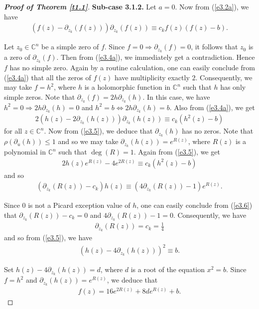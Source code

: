 \documentclass[11pt, reqno]{amsart}
\newtheorem*{cor A}{Corollary A}
\newtheorem*{cor B}{Corollary B}
\numberwithin{equation}{section}
\begin{document}
\begin{proof}[{\bf Proof of Theorem \ref{t1.1}}]
\smallskip
{\bf Sub-case 3.1.2.} Let $a=0$. Now from (\ref{e3.2a}), we have
\begin{align}\label{e3.4a} 
(f(z)-\partial_{z_k}(f(z)))\partial_{z_k}(f(z))\equiv c_k f(z)(f(z)-b).
\end{align}

Let $z_0\in\mathbb{C}^n$ be a simple zero of $f$. Since $f=0\Rightarrow \partial_{z_k}(f)=0$, it follows that $z_0$ is a zero of $\partial_{z_k}(f)$. Then from (\ref{e3.4a}), we immediately get a contradiction. Hence $f$ has no simple zero.
Again by a routine calculation, one can easily conclude from (\ref{e3.4a}) that all the zeros of $f(z)$ have multiplicity exactly $2$.  Consequently, we may take $f=h^2$, where $h$ is a holomorphic function in $\mathbb{C}^n$ such that $h$ has only simple zeros. Note that $\partial_{z_k}(f)=2h\partial_{z_k}(h)$. In this case, we have
$h^2=0\Rightarrow 2h\partial_{z_k}(h)=0$ and $h^2=b\Leftrightarrow 2h\partial_{z_k}(h)=b$. Also from (\ref{e3.4a}), we get
\begin{align}\label{e3.5} 
2(h(z)-2\partial_{z_k}(h(z)))\partial_{z_k}(h(z))\equiv c_k(h^2(z)-b)
\end{align}
for all $z\in\mathbb{C}^n$. Now from (\ref{e3.5}), we deduce that $\partial_{z_k}(h)$ has no zeros. Note that $\rho(\partial_u(h))\leq 1$ and so we may take $\partial_{z_k}(h(z))=e^{R(z)}$, where $R(z)$ is a polynomial in $\mathbb{C}^n$ such that $\deg(R)=1$. Again from (\ref{e3.5}), we get
\begin{align*}
 2h(z)e^{R(z)}-4e^{2R(z)}\equiv c_k(h^2(z)-b)
 \end{align*}
and so
\begin{align}\label{e3.6} 
(\partial_{z_k}(R(z))-c_k)h(z)\equiv (4\partial_{z_k}(R(z))-1)e^{R(z)}.
\end{align}

Since $0$ is not a Picard exception value of $h$, one can easily conclude from (\ref{e3.6}) that $\partial_{z_k}(R(z))-c_k=0$ and $4\partial_{z_k}(R(z))-1=0$. Consequently, we have 
\begin{align*}
\partial_{z_k}(R(z))=c_k=\frac{1}{4}
\end{align*}
and so from (\ref{e3.5}), we have 
\begin{align*}
(h(z)-4\partial_{z_k}(h(z)))^2\equiv b.
\end{align*}

Set $h(z)-4\partial_{z_k}(h(z))=d$, where $d$ is a root of the equation $x^2=b$. Since $f=h^2$ and $\partial_{z_k}(h(z))=e^{R(z)}$, we deduce that 
\begin{align*}
f(z)=16e^{2R(z)}+8de^{R(z)}+b.
\end{align*}


\end{proof}
\end{document}
